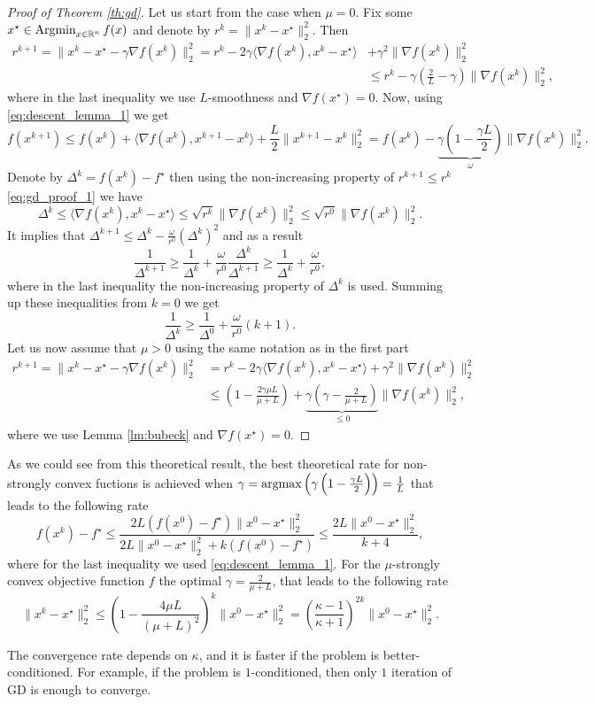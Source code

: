 \begin{proof}[Proof of Theorem \ref{th:gd}]
Let us start from the case when $\mu = 0$. Fix some $x^\star\in\operatorname*{Argmin}_{x\in\mathbb{R}^n} f(x)$ and denote by $r^k = \|x^k-x^\star\|^2_2$.
Then 
\begin{align}\label{eq:gd_proof_1}
r^{k+1} = \|x^k - x^\star - \gamma\nabla f(x^k)\|_2^2 = r^k - 2\gamma\langle \nabla f(x^k), x^k - x^\star\rangle &+ \gamma^2\|\nabla f(x^k)\|_2^2\nonumber\\
&\leq r^k - \gamma\left(\frac2L - \gamma\right)\|\nabla f(x^k)\|_2^2,
\end{align}
where in the last inequality we use $L$-smoothness and $\nabla f(x^\star) = 0$. Now, using \eqref{eq:descent_lemma_1} we get
$$
f(x^{k+1})\leq f(x^k) + \langle \nabla f(x^k), x^{k+1} - x^k\rangle + \frac{L}{2}\|x^{k+1}- x^k\|_2^2 = f(x^k) - \underbrace{\gamma\left(1 - \frac{\gamma L}{2}\right)}_{\omega}\|\nabla f(x^k)\|_2^2.
$$
Denote by $\Delta^k = f(x^k)-f^\star$ then using the non-increasing property of $r^{k+1}\leq r^k$ \eqref{eq:gd_proof_1} we have
$$
\Delta^k \leq\langle\nabla f(x^k), x^k-x^\star\rangle\leq \sqrt{r^k}\|\nabla f(x^k)\|_2^2\leq \sqrt{r^0}\|\nabla f(x^k)\|_2^2.
$$
It implies that $\Delta^{k+1}\leq\Delta^k - \frac{\omega}{r^0}(\Delta^k)^2$ and as a result
$$
\frac{1}{\Delta^{k+1}}\geq \frac{1}{\Delta^k} + \frac{\omega}{r^0}\frac{\Delta^k}{\Delta^{k+1}}\geq \frac{1}{\Delta^k} + \frac{\omega}{r^0},
$$
where in the last inequality the non-increasing property of $\Delta^k$ is used.
Summing up these inequalities from $k=0$ we get
$$
\frac{1}{\Delta^k}\geq \frac{1}{\Delta^0} + \frac{\omega}{r^0}(k+1).
$$
Let us now assume that $\mu> 0$ using the same notation as in the first part
\begin{align}
r^{k+1} = \|x^k - x^\star - \gamma \nabla f(x^k)\|_2^2 &= r^k - 2\gamma\langle \nabla f(x^k), x^k - x^\star\rangle + \gamma^2\|\nabla f(x^k)\|_2^2\nonumber\\
&\leq \left(1-\frac{2\gamma\mu L}{\mu + L}\right) + \underbrace{\gamma\left(\gamma - \frac{2}{\mu + L}\right)}_{\leq 0}\|\nabla f(x^k)\|_2^2,
\end{align}
where we use Lemma \ref{lm:bubeck} and $\nabla f(x^\star) = 0$.
\end{proof}
As we could see from this theoretical result, the best theoretical rate for non-strongly convex fuctions is achieved when $\gamma = \operatorname*{argmax}\left(\gamma\left(1 - \frac{\gamma L}{2}\right)\right) = \frac{1}{L}$ that leads to the following rate
\begin{equation}\label{eq:gd_rate}
    f(x^k) - f^\star \leq \frac{2L(f(x^0)-f^\star)\|x^0-x^\star\|_2^2}{2L\|x^0-x^\star\|_2^2 +k(f(x^0) - f^\star)}\leq \frac{2L\|x^0-x^\star\|^2_2}{k+4},
\end{equation}
where for the last inequality we used \eqref{eq:descent_lemma_1}.
For the $\mu$-strongly convex objective function $f$ the optimal $\gamma= \frac{2}{\mu + L}$, that leads to the following rate
\begin{equation}\label{eq:gd_rate_strongly}
\|x^k-x^\star\|_2^2\leq\left(1-\frac{4\mu L}{(\mu + L)^2}\right)^k\|x^0-x^\star\|_2^2 = \left(\frac{\kappa - 1}{\kappa + 1}\right)^{2k}\|x^0-x^\star\|_2^2.
\end{equation}

{\color{blue} The convergence rate depends on $\kappa$, and it is faster if the problem is better-conditioned. For example, if the problem is $1$-conditioned, then only $1$ iteration of GD is enough to converge.}